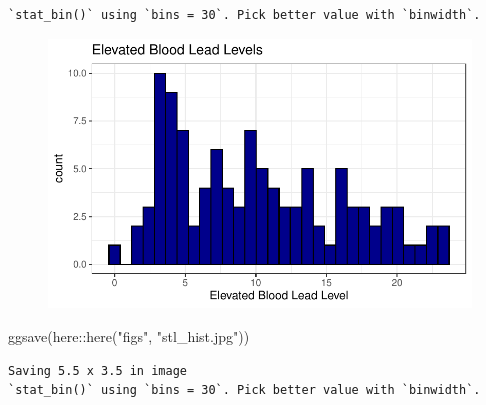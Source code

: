 \documentclass[
  letterpaper,
  DIV=11,
  numbers=noendperiod]{scrartcl}
\newenvironment{Shaded}{\begin{snugshade}}{\end{snugshade}}
\newcommand{\FunctionTok}[1]{\textcolor[rgb]{0.28,0.35,0.67}{#1}}
\newcommand{\NormalTok}[1]{\textcolor[rgb]{0.00,0.23,0.31}{#1}}
\newcommand{\SpecialCharTok}[1]{\textcolor[rgb]{0.37,0.37,0.37}{#1}}
\newcommand{\StringTok}[1]{\textcolor[rgb]{0.13,0.47,0.30}{#1}}
\begin{document}
\begin{verbatim}
`stat_bin()` using `bins = 30`. Pick better value with `binwidth`.
\end{verbatim}

\begin{figure}[H]

{\centering \includegraphics{stl_lead_inequity_files/figure-pdf/unnamed-chunk-4-1.pdf}

}

\end{figure}

\begin{Shaded}
\begin{Highlighting}[]
\FunctionTok{ggsave}\NormalTok{(here}\SpecialCharTok{::}\FunctionTok{here}\NormalTok{(}\StringTok{"figs"}\NormalTok{, }\StringTok{"stl\_hist.jpg"}\NormalTok{))}
\end{Highlighting}
\end{Shaded}

\begin{verbatim}
Saving 5.5 x 3.5 in image
`stat_bin()` using `bins = 30`. Pick better value with `binwidth`.
\end{verbatim}
\end{document}
